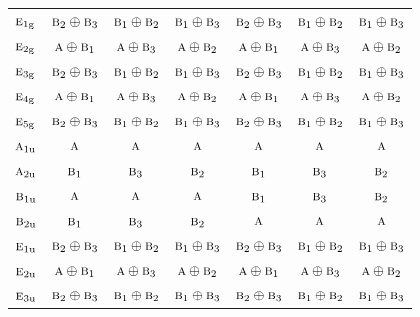 \documentclass[10pt,a4paper]{article}
\numberwithin{equation}{section}
\newcommand{\irr}[1]{\text{\normalfont\scshape #1}}
\newcommand{\ptag}[1]{\mathrm{#1}}
\begin{document}
{\begin{longtable}{@{}lcccccc@{}}
$\irr{e}_{1\ptag{g}}$ & $\irr{b}_{2}\oplus \irr{b}_{3}$ & $\irr{b}_{1}\oplus \irr{b}_{2}$ & $\irr{b}_{1}\oplus \irr{b}_{3}$ & $\irr{b}_{2}\oplus \irr{b}_{3}$ & $\irr{b}_{1}\oplus \irr{b}_{2}$ & $\irr{b}_{1}\oplus \irr{b}_{3}$\\
$\irr{e}_{2\ptag{g}}$ & $\irr{a}\oplus \irr{b}_{1}$ & $\irr{a}\oplus \irr{b}_{3}$ & $\irr{a}\oplus \irr{b}_{2}$ & $\irr{a}\oplus \irr{b}_{1}$ & $\irr{a}\oplus \irr{b}_{3}$ & $\irr{a}\oplus \irr{b}_{2}$\\
$\irr{e}_{3\ptag{g}}$ & $\irr{b}_{2}\oplus \irr{b}_{3}$ & $\irr{b}_{1}\oplus \irr{b}_{2}$ & $\irr{b}_{1}\oplus \irr{b}_{3}$ & $\irr{b}_{2}\oplus \irr{b}_{3}$ & $\irr{b}_{1}\oplus \irr{b}_{2}$ & $\irr{b}_{1}\oplus \irr{b}_{3}$\\
$\irr{e}_{4\ptag{g}}$ & $\irr{a}\oplus \irr{b}_{1}$ & $\irr{a}\oplus \irr{b}_{3}$ & $\irr{a}\oplus \irr{b}_{2}$ & $\irr{a}\oplus \irr{b}_{1}$ & $\irr{a}\oplus \irr{b}_{3}$ & $\irr{a}\oplus \irr{b}_{2}$\\
$\irr{e}_{5\ptag{g}}$ & $\irr{b}_{2}\oplus \irr{b}_{3}$ & $\irr{b}_{1}\oplus \irr{b}_{2}$ & $\irr{b}_{1}\oplus \irr{b}_{3}$ & $\irr{b}_{2}\oplus \irr{b}_{3}$ & $\irr{b}_{1}\oplus \irr{b}_{2}$ & $\irr{b}_{1}\oplus \irr{b}_{3}$\\
$\irr{a}_{1\ptag{u}}$ & $\irr{a}$ & $\irr{a}$ & $\irr{a}$ & $\irr{a}$ & $\irr{a}$ & $\irr{a}$\\
$\irr{a}_{2\ptag{u}}$ & $\irr{b}_{1}$ & $\irr{b}_{3}$ & $\irr{b}_{2}$ & $\irr{b}_{1}$ & $\irr{b}_{3}$ & $\irr{b}_{2}$\\
$\irr{b}_{1\ptag{u}}$ & $\irr{a}$ & $\irr{a}$ & $\irr{a}$ & $\irr{b}_{1}$ & $\irr{b}_{3}$ & $\irr{b}_{2}$\\
$\irr{b}_{2\ptag{u}}$ & $\irr{b}_{1}$ & $\irr{b}_{3}$ & $\irr{b}_{2}$ & $\irr{a}$ & $\irr{a}$ & $\irr{a}$\\
$\irr{e}_{1\ptag{u}}$ & $\irr{b}_{2}\oplus \irr{b}_{3}$ & $\irr{b}_{1}\oplus \irr{b}_{2}$ & $\irr{b}_{1}\oplus \irr{b}_{3}$ & $\irr{b}_{2}\oplus \irr{b}_{3}$ & $\irr{b}_{1}\oplus \irr{b}_{2}$ & $\irr{b}_{1}\oplus \irr{b}_{3}$\\
$\irr{e}_{2\ptag{u}}$ & $\irr{a}\oplus \irr{b}_{1}$ & $\irr{a}\oplus \irr{b}_{3}$ & $\irr{a}\oplus \irr{b}_{2}$ & $\irr{a}\oplus \irr{b}_{1}$ & $\irr{a}\oplus \irr{b}_{3}$ & $\irr{a}\oplus \irr{b}_{2}$\\
$\irr{e}_{3\ptag{u}}$ & $\irr{b}_{2}\oplus \irr{b}_{3}$ & $\irr{b}_{1}\oplus \irr{b}_{2}$ & $\irr{b}_{1}\oplus \irr{b}_{3}$ & $\irr{b}_{2}\oplus \irr{b}_{3}$ & $\irr{b}_{1}\oplus \irr{b}_{2}$ & $\irr{b}_{1}\oplus \irr{b}_{3}$\\

\end{longtable}}
\end{document}
